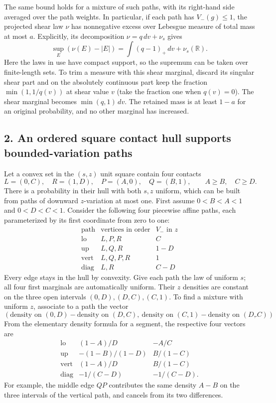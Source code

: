 \documentclass[
  10pt,
]{article}
\begin{document}
The same bound holds for a mixture of such paths, with its right-hand
side averaged over the path weights. In particular, if each path has
\(V_-(g)\le1\), the projected shear law \(\nu\) has nonnegative excess
over Lebesgue measure of total mass at most \(a\). Explicitly, its
decomposition \(\nu=q\,dv+\nu_s\) gives \[
\sup_E(\nu(E)-|E|)=\int(q-1)_+\,dv+\nu_s(\mathbb R).
\] Here the laws in use have compact support, so the supremum can be
taken over finite-length sets. To trim a measure with this shear
marginal, discard its singular shear part and on the absolutely
continuous part keep the fraction \(\min(1,1/q(v))\) at shear value
\(v\) (take the fraction one when \(q(v)=0\)). The shear marginal
becomes \(\min(q,1)\,dv\). The retained mass is at least \(1-a\) for an
original probability, and no other marginal has increased.

\subsection{2. An ordered square contact hull supports bounded-variation
paths}\label{an-ordered-square-contact-hull-supports-bounded-variation-paths}

Let a convex set in the \((s,z)\) unit square contain four contacts \[
L=(0,C),\quad R=(1,D),\quad P=(A,0),\quad Q=(B,1),
\qquad A\ge B,\quad C\ge D.
\] There is a probability in their hull with both \(s,z\) uniform, which
can be built from paths of downward \(z\)-variation at most one. First
assume \(0<B<A<1\) and \(0<D<C<1\). Consider the following four
piecewise affine paths, each parameterized by its first coordinate from
zero to one: \[
\begin{array}{c|c|c}
\text{path}&\text{vertices in order}& V_-\text{ in }z\\ \hline
\mathrm{lo}& L,P,R & C\\
\mathrm{up}& L,Q,R & 1-D\\
\mathrm{vert}& L,Q,P,R & 1\\
\mathrm{diag}& L,R & C-D
\end{array}
\] Every edge stays in the hull by convexity. Give each path the law of
uniform \(s\); all four first marginals are automatically uniform. Their
\(z\) densities are constant on the three open intervals
\((0,D),(D,C),(C,1)\). To find a mixture with uniform \(z\), associate
to a path the vector \[
(\text{density on }(0,D)-\text{density on }(D,C),\
 \text{density on }(C,1)-\text{density on }(D,C)).
\] From the elementary density formula for a segment, the respective
four vectors are \[
\begin{array}{c|cc}
\mathrm{lo} & (1-A)/D &-A/C\\
\mathrm{up} & -(1-B)/(1-D)& B/(1-C)\\
\mathrm{vert}&(1-A)/D & B/(1-C)\\
\mathrm{diag}&-1/(C-D)&-1/(C-D).
\end{array}
\] For example, the middle edge \(QP\) contributes the same density
\(A-B\) on the three intervals of the vertical path, and cancels from
its two differences.
\end{document}
